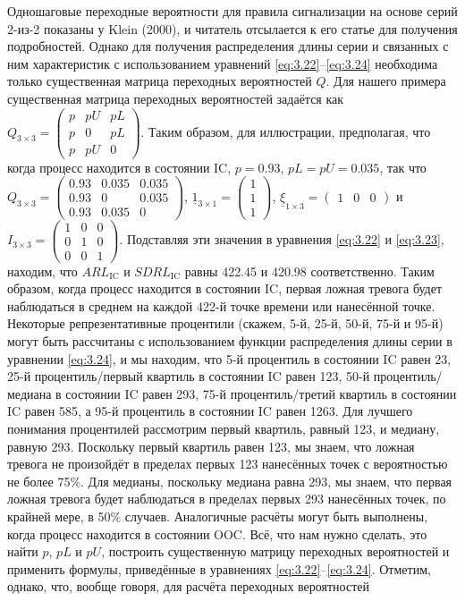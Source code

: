 Одношаговые переходные вероятности для правила сигнализации на основе серий 2-из-2 показаны у Klein (2000), и читатель отсылается к его статье для получения подробностей. Однако для получения распределения длины серии и связанных с ним характеристик с использованием уравнений \eqref{eq:3.22}–\eqref{eq:3.24} необходима только существенная матрица переходных вероятностей \(Q\). Для нашего примера существенная матрица переходных вероятностей задаётся как \(Q_{3 \times 3} = \begin{pmatrix} p & pU & pL \\ p & 0 & pL \\ p & pU & 0 \end{pmatrix}\). Таким образом, для иллюстрации, предполагая, что когда процесс находится в состоянии IC, \(p = 0.93\), \(pL = pU = 0.035\), так что \(Q_{3 \times 3} = \begin{pmatrix} 0.93 & 0.035 & 0.035 \\ 0.93 & 0 & 0.035 \\ 0.93 & 0.035 & 0 \end{pmatrix}\), \(\underline{1}_{3 \times 1} = \begin{pmatrix} 1 \\ 1 \\ 1 \end{pmatrix}\), \(\underline{\xi}_{1 \times 3} = \begin{pmatrix} 1 & 0 & 0 \end{pmatrix}\) и \(I_{3 \times 3} = \begin{pmatrix} 1 & 0 & 0 \\ 0 & 1 & 0 \\ 0 & 0 & 1 \end{pmatrix}\). Подставляя эти значения в уравнения \eqref{eq:3.22} и \eqref{eq:3.23}, находим, что \(ARL_{\text{IC}}\) и \(SDRL_{\text{IC}}\) равны 422.45 и 420.98 соответственно. Таким образом, когда процесс находится в состоянии IC, первая ложная тревога будет наблюдаться в среднем на каждой 422-й точке времени или нанесённой точке. Некоторые репрезентативные процентили (скажем, 5-й, 25-й, 50-й, 75-й и 95-й) могут быть рассчитаны с использованием функции распределения длины серии в уравнении \eqref{eq:3.24}, и мы находим, что 5-й процентиль в состоянии IC равен 23, 25-й процентиль/первый квартиль в состоянии IC равен 123, 50-й процентиль/медиана в состоянии IC равен 293, 75-й процентиль/третий квартиль в состоянии IC равен 585, а 95-й процентиль в состоянии IC равен 1263. Для лучшего понимания процентилей рассмотрим первый квартиль, равный 123, и медиану, равную 293. Поскольку первый квартиль равен 123, мы знаем, что ложная тревога не произойдёт в пределах первых 123 нанесённых точек с вероятностью не более 75\%. Для медианы, поскольку медиана равна 293, мы знаем, что первая ложная тревога будет наблюдаться в пределах первых 293 нанесённых точек, по крайней мере, в 50\% случаев. Аналогичные расчёты могут быть выполнены, когда процесс находится в состоянии OOC. Всё, что нам нужно сделать, это найти \(p\), \(pL\) и \(pU\), построить существенную матрицу переходных вероятностей и применить формулы, приведённые в уравнениях \eqref{eq:3.22}–\eqref{eq:3.24}. Отметим, однако, что, вообще говоря, для расчёта переходных вероятностей 